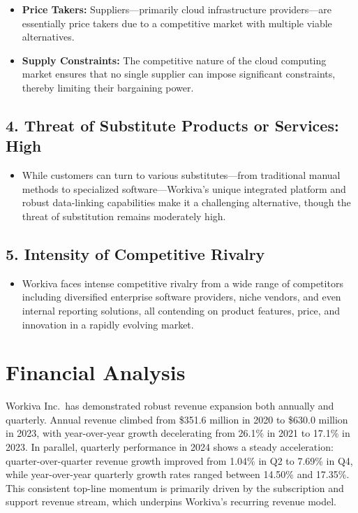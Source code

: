 \documentclass[
  10pt,
  a4paper,
]{article}
\providecommand{\tightlist}{%
  \setlength{\itemsep}{0pt}\setlength{\parskip}{0pt}}\usepackage{longtable,booktabs,array}
\begin{document}
\begin{itemize}
\tightlist
\item
  \textbf{Price Takers:} Suppliers---primarily cloud infrastructure
  providers---are essentially price takers due to a competitive market
  with multiple viable alternatives.
\item
  \textbf{Supply Constraints:} The competitive nature of the cloud
  computing market ensures that no single supplier can impose
  significant constraints, thereby limiting their bargaining power.
\end{itemize}

\subsection{4. Threat of Substitute Products or Services:
High}\label{threat-of-substitute-products-or-services-high}

\begin{itemize}
\tightlist
\item
  While customers can turn to various substitutes---from traditional
  manual methods to specialized software---Workiva's unique integrated
  platform and robust data-linking capabilities make it a challenging
  alternative, though the threat of substitution remains moderately
  high.
\end{itemize}

\subsection{5. Intensity of Competitive
Rivalry}\label{intensity-of-competitive-rivalry}

\begin{itemize}
\tightlist
\item
  Workiva faces intense competitive rivalry from a wide range of
  competitors including diversified enterprise software providers, niche
  vendors, and even internal reporting solutions, all contending on
  product features, price, and innovation in a rapidly evolving market.
\end{itemize}

\section{Financial Analysis}\label{financial-analysis}

Workiva Inc.~has demonstrated robust revenue expansion both annually and
quarterly. Annual revenue climbed from \$351.6 million in 2020 to
\$630.0 million in 2023, with year-over-year growth decelerating from
26.1\% in 2021 to 17.1\% in 2023. In parallel, quarterly performance in
2024 shows a steady acceleration: quarter-over-quarter revenue growth
improved from 1.04\% in Q2 to 7.69\% in Q4, while year-over-year
quarterly growth rates ranged between 14.50\% and 17.35\%. This
consistent top-line momentum is primarily driven by the subscription and
support revenue stream, which underpins Workiva's recurring revenue
model.
\end{document}
